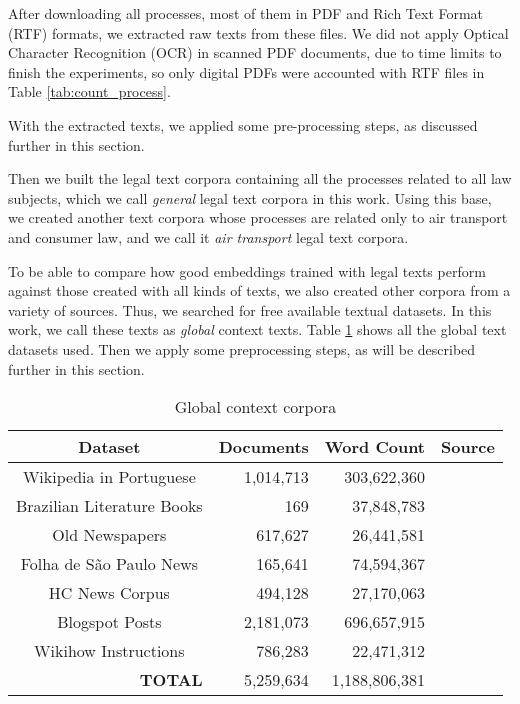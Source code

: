 After downloading all processes, most of them in PDF and Rich Text Format (RTF) formats, we extracted raw texts from these files. We did not apply Optical Character Recognition (OCR) in scanned PDF documents, due to time limits to finish the experiments, so only digital PDFs were accounted with RTF files in Table \ref{tab:count_process}. 

With the extracted texts, we applied some pre-processing steps, as discussed further in this section. 

Then we built the legal text corpora containing all the processes related to all law subjects, which we call \emph{general} legal text corpora in this work. Using this base, we created another text corpora whose processes are related only to air transport and consumer law, and we call it \emph{air transport} legal text corpora.

To be able to compare how good embeddings trained with legal texts perform against those created with all kinds of texts, we also created other corpora from a variety of sources. Thus, we searched for free available textual datasets. In this work, we call these texts as \emph{global} context texts. Table \ref{tab:global_corpora} shows all the global text datasets used. Then we apply some preprocessing steps, as will be described further in this section.

\begin{table}[htb]
\caption{Global context corpora}
\label{tab:global_corpora}
\centering
\begin{tabular}{@{}crrc@{}}
\toprule
\textbf{Dataset}                   & \textbf{Documents} & \textbf{Word Count} & \textbf{Source} \\ \midrule
Wikipedia in Portuguese            & 1,014,713          & 303,622,360         & \textcite{Wikipedia2019}                \\\hdashline
Brazilian Literature Books         & 169                & 37,848,783          & \textcite{Tatman2017}                 \\\hdashline
Old Newspapers                     & 617,627            & 26,441,581          &         \textcite{Tan2020}     \\\hdashline
Folha de São Paulo News            & 165,641            & 74,594,367          &                     \textcite{Marlessonn2019}             \\\hdashline
HC News Corpus                     & 494,128            & 27,170,063          &        \textcite{Christensen2016}         \\\hdashline
Blogspot Posts                     & 2,181,073          & 696,657,915         &          \textcite{Santos2018}       \\\hdashline
Wikihow Instructions               & 786,283            & 22,471,312          &        \textcite{Chocron2018}         \\ \midrule
\multicolumn{1}{r}{\textbf{TOTAL}} & 5,259,634          & 1,188,806,381       & \textbf{}       \\ \bottomrule
\end{tabular}

\end{table}
